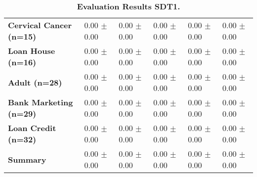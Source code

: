 \begin{table}[htb]
{\begin{tabular}{llllll}
\textbf{Cervical Cancer (n=15)                   } &  \phantom{0}0.00 $\pm$ \phantom{0}0.00 &             \phantom{0}0.00 $\pm$ \phantom{0}0.00 &  \phantom{0}0.00 $\pm$ \phantom{0}0.00 &  \phantom{0}0.00 $\pm$ \phantom{0}0.00 &  \phantom{0}0.00 $\pm$ \phantom{0}0.00 \\
\textbf{Loan House (n=16)                        } &  \phantom{0}0.00 $\pm$ \phantom{0}0.00 &             \phantom{0}0.00 $\pm$ \phantom{0}0.00 &  \phantom{0}0.00 $\pm$ \phantom{0}0.00 &  \phantom{0}0.00 $\pm$ \phantom{0}0.00 &  \phantom{0}0.00 $\pm$ \phantom{0}0.00 \\
\textbf{Adult (n=28)                             } &  \phantom{0}0.00 $\pm$ \phantom{0}0.00 &             \phantom{0}0.00 $\pm$ \phantom{0}0.00 &  \phantom{0}0.00 $\pm$ \phantom{0}0.00 &  \phantom{0}0.00 $\pm$ \phantom{0}0.00 &  \phantom{0}0.00 $\pm$ \phantom{0}0.00 \\
\textbf{Bank Marketing (n=29)                    } &  \phantom{0}0.00 $\pm$ \phantom{0}0.00 &             \phantom{0}0.00 $\pm$ \phantom{0}0.00 &  \phantom{0}0.00 $\pm$ \phantom{0}0.00 &  \phantom{0}0.00 $\pm$ \phantom{0}0.00 &  \phantom{0}0.00 $\pm$ \phantom{0}0.00 \\
\textbf{Loan Credit (n=32)                       } &  \phantom{0}0.00 $\pm$ \phantom{0}0.00 &             \phantom{0}0.00 $\pm$ \phantom{0}0.00 &  \phantom{0}0.00 $\pm$ \phantom{0}0.00 &  \phantom{0}0.00 $\pm$ \phantom{0}0.00 &  \phantom{0}0.00 $\pm$ \phantom{0}0.00 \\
\midrule
\textbf{Summary                                  } &  \phantom{0}0.00 $\pm$ \phantom{0}0.00 &             \phantom{0}0.00 $\pm$ \phantom{0}0.00 &  \phantom{0}0.00 $\pm$ \phantom{0}0.00 &  \phantom{0}0.00 $\pm$ \phantom{0}0.00 &  \phantom{0}0.00 $\pm$ \phantom{0}0.00 \\
\bottomrule
\end{tabular}%
}
\caption{\textbf{Evaluation Results SDT1.}}
\label{tab:eval-results}
\end{table}


